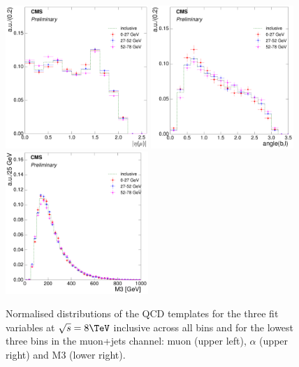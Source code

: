 \begin{figure}[hbtp]
    \centering
     \includegraphics[width=0.48\textwidth]{Chapters/04_Analysis/04b_XSections/images/8TeV/fit_variables/muon/WPT/muon_absolute_eta/qcd/WPT_muon_absolute_eta_0orMoreBtag_QCD_template_comparison.pdf}\hfill
     \includegraphics[width=0.48\textwidth]{Chapters/04_Analysis/04b_XSections/images/8TeV/fit_variables/muon/WPT/angle_bl/qcd/WPT_angle_bl_1orMoreBtag_QCD_template_comparison.pdf}\\
     \includegraphics[width=0.48\textwidth]{Chapters/04_Analysis/04b_XSections/images/8TeV/fit_variables/muon/WPT/M3/qcd/WPT_M3_0orMoreBtag_QCD_template_comparison.pdf}\\
	 \caption{Normalised distributions of the QCD templates for the three fit variables at $\sqrt{s}=8\TeV$
	 inclusive across all \wpt bins and for the lowest three \wpt bins in the muon+jets channel: muon \abseta
	 (upper left), $\alpha$ (upper right) and M3 (lower right).}
     \label{fig:WPT_fit_variable_qcd_comparisons_muon_8TeV}
\end{figure}

